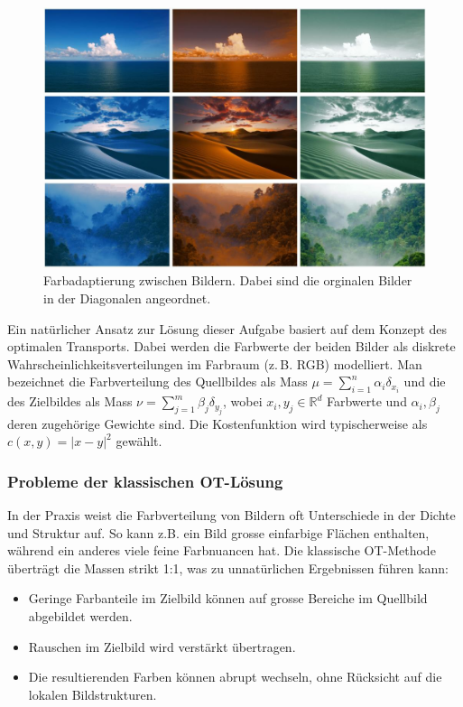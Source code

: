 \begin{figure}
\centering
\includegraphics[width=\textwidth]{papers/mongekant/code/adaption}
\caption{Farbadaptierung zwischen Bildern.
Dabei sind die orginalen Bilder in der Diagonalen angeordnet.
}
\label{mongekant:fig:adaption}
\end{figure}

Ein natürlicher Ansatz zur Lösung dieser Aufgabe
basiert auf dem Konzept des optimalen Transports.
Dabei werden die Farbwerte der beiden Bilder
als diskrete Wahrscheinlichkeitsverteilungen im Farbraum (z.\,B. RGB) modelliert.
Man bezeichnet die Farbverteilung des Quellbildes
als Mass $\mu = \sum_{i=1}^n \alpha_i \delta_{x_i}$ und
die des Zielbildes als Mass $\nu = \sum_{j=1}^m \beta_j \delta_{y_j}$,
wobei $x_i, y_j \in \mathbb{R}^d$ Farbwerte und
$\alpha_i, \beta_j$ deren zugehörige Gewichte sind.
Die Kostenfunktion wird typischerweise als $c(x,y) = |x - y|^2$ gewählt.

\subsubsection{Probleme der klassischen OT-Lösung}
In der Praxis weist die Farbverteilung von Bildern
oft Unterschiede in der Dichte und Struktur auf.
So kann z.B. ein Bild grosse einfarbige Flächen enthalten,
während ein anderes viele feine Farbnuancen hat.
Die klassische OT-Methode überträgt die Massen strikt 1:1,
was zu unnatürlichen Ergebnissen führen kann:
\begin{itemize}
\item Geringe Farbanteile im Zielbild können
auf grosse Bereiche im Quellbild abgebildet werden.
\item Rauschen im Zielbild wird verstärkt übertragen.
\item Die resultierenden Farben können abrupt wechseln,
ohne Rücksicht auf die lokalen Bildstrukturen.
\end{itemize}

